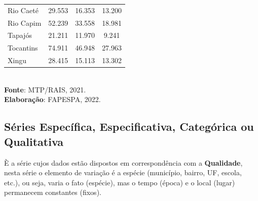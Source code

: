 \begin{table}[!htb]
{\begin{tabular}{l|c|c|c}
Rio Caeté                  &  29.553                                    &  16.353                       &   13.200                           \\
Rio Capim                  &  52.239                                    &  33.558                       &   18.981                           \\
Tapajós                    &  21.211                                    &  11.970                       &   9.241                           \\
Tocantins                  &  74.911                                    &  46.948                       &   27.963                           \\
Xingu                      &  28.415                                    &  15.113                       &   13.302                           \\ \hline\hline
\end{tabular}}
\\ 
\hspace{-6.9cm}
\textbf{Fonte}: MTP/RAIS, 2021. \\
\hspace{-6.2cm}
\textbf{Elaboração}: FAPESPA, 2022.
\end{table}


\newpage
\subsection{Séries Específica, Especificativa, Categórica ou Qualitativa}

È a série cujos dados estão dispostos em correspondência com a \textbf{Qualidade}, nesta série o elemento de variação é a espécie (município, bairro, UF, escola, etc.), ou seja, varia o fato (espécie), mas o tempo (época) e o local (lugar) permanecem constantes (fixos).


